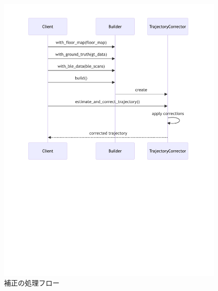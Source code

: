 \begin{figure}[H]
    \centering
    \includegraphics[width=\linewidth]{image/corrector-flow-diagram.pdf}
    \caption{補正の処理フロー}
    \label{fig:corrector-sequence}
\end{figure}
